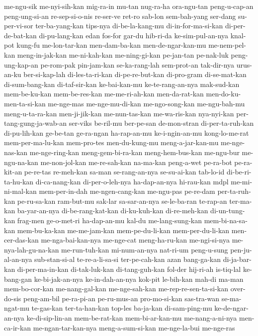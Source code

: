 {me-ngu-sik me-nyi-sih-kan mig-ra-in mu-tan nug-ra-ha ora-ngu-tan peng-u-cap-an peng-ung-si-an
re-sep-si-o-nis re-ser-ve ret-ro sab-lon sem-bah-yang ser-dang su-per-vi-sor ter-ba-yang-kan
tips-nya di-be-la-kang-mu di-in-for-ma-si-kan di-per-de-bat-kan di-pu-lang-kan edan fos-for gar-du
hib-ri-da ke-sim-pul-an-nya knal-pot kung-fu me-lon-tar-kan men-dam-ba-kan men-de-ngar-kan-mu me-nem-pel-kan
meng-in-jak-kan me-ni-kah-kan me-ning-gi-kan pe-jan-tan pe-nak-luk peng-ung-kap-an pe-rom-pak pin-jam-kan
se-ka-rang-lah sem-prot-an tak-dir-nya urus-an-ku ber-si-kap-lah di-les-ta-ri-kan di-pe-re-but-kan di-pro-gram
di-se-mat-kan di-sum-bang-kan di-taf-sir-kan ke-bai-kan-mu ke-te-rang-an-nya mak-sud-kan mem-be-ku-kan mem-be-res-kan
me-me-ri-ah-kan men-da-rat-kan men-do-ku-men-ta-si-kan me-nge-mas me-nge-mu-di-kan me-ngo-song-kan me-ngu-bah-mu meng-u-ta-ra-kan
men-ji-jik-kan me-nun-tas-kan me-wa-ris-kan nya-nyi-kan per-tang-gung-ja-wab-an ser-viks be-ril-mu ber-pe-san
de-mon-stran di-per-ta-ruh-kan di-pu-lih-kan ge-be-tan ge-ra-ngan ha-rap-an-mu ke-i-ngin-an-mu kong-lo-me-rat
mem-per-ma-lu-kan mem-pro-tes men-du-kung-mu meng-a-jar-kan-mu me-nge-nas-kan me-nge-ring-kan meng-gem-bi-ra-kan meng-hem-bus-kan
me-ngu-bur me-ngu-na-kan me-non-jol-kan me-re-sah-kan na-ma-kan peng-a-wet pe-ra-bot pe-ra-kit-an
pe-re-tas re-meh-kan sa-man se-rang-an-nya se-su-ai-kan tab-lo-id di-be-ri-ta-hu-kan di-ca-nang-kan
di-per-o-leh-nya ha-dap-an-nya hi-rau-kan mdpl me-mi-ni-mal-kan mem-per-in-dah me-ngen-cang-kan me-ngu-pas
pe-re-dam per-ta-ruh-kan pe-ru-sa-kan ram-but-mu sak-lar sa-sar-an-nya se-le-ba-ran te-rap-an
ter-ma-kan ba-yar-an-nya di-be-rang-kat-kan di-ku-kuh-kan di-re-meh-kan di-un-tung-kan frag-men ge-o-met-ri
ha-dap-an-mu kal-du me-lang-sung-kan mem-bi-na-sa-kan mem-bu-ka-kan me-me-jam-kan mem-pe-du-li-kan mem-per-du-li-kan
men-cer-das-kan me-nga-bai-kan-nya me-nge-cat meng-ha-ru-kan me-ngi-si-nya me-nya-lah-gu-na-kan me-run-tuh-kan mi-num-an-nya
nat-ri-um peng-u-sung pen-ju-al-an-nya sub-stan-si-al te-re-a-li-sa-si ter-pe-cah-kan azan bang-ga-kan
di-ja-bar-kan di-per-ma-in-kan di-tak-luk-kan di-tang-guh-kan fol-der hij-ri-ah is-tiq-lal ke-bang-gan
ke-bi-jak-an-nya ke-in-dah-an-nya kok-pit le-bih-kan mah-di ma-man mem-bo-cor-kan me-nang-gal-kan
me-nge-sah-kan me-rep-re-sen-ta-si-kan over-do-sis peng-am-bil pe-ra-pi-an pe-ru-mus-an pro-mo-si-kan sas-tra-wan
se-ma-ngat-mu te-gas-kan ter-ta-han-kan top-les ba-ja-kan di-sam-ping-mu ke-de-ngar-an-nya ke-di-sip-lin-an
mem-be-rat-kan mem-bi-ar-kan-mu me-nang-a-ni-nya men-ca-ir-kan me-ngan-tar-kan-nya meng-a-sum-si-kan me-nge-la-bui me-nge-ras
}
